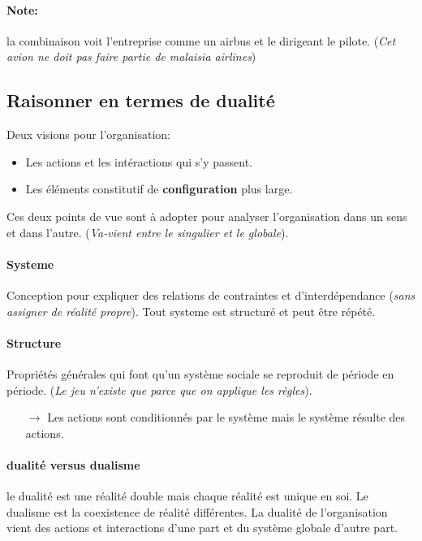 \documentclass[11pt]{article} %
\begin{document}
\paragraph{Note:} la combinaison voit l'entreprise comme un airbus et le 
dirigeant le pilote. (\textit{Cet avion ne doit pas faire partie de 
malaisia airlines})

\subsection{Raisonner en termes de dualité}
Deux visions pour l'organisation:
\begin{itemize}
	\item Les actions et les intéractions qui s'y passent.
    \item Les éléments constitutif de \textbf{configuration} plus large.
\end{itemize}

Ces deux points de vue sont à adopter pour analyser l'organisation dans
un  sens et  dans l'autre.  (\textit{Va-vient entre  le singulier  et le
globale}).

\paragraph{Systeme}   
Conception pour expliquer des relations de contraintes et
d'interdépendance (\textit{sans assigner de réalité propre}). Tout
systeme est structuré et peut être répété.

\paragraph{Structure} 
Propriétés générales qui font qu'un système sociale se reproduit de
période en période. (\textit{Le jeu n'existe que parce que on applique
les règles}). 

\begin{itemize}
    \item[$\to$] Les actions sont conditionnés par le système mais le
système résulte des actions.
\end{itemize}

\paragraph{dualité  versus  dualisme}  le dualité  est  une  réalité
double  mais chaque  réalité est  unique en  soi. Le  dualisme est  la
coexistence  de réalité  différentes. La  dualité de  l'organisation
vient  des actions  et interactions  d'une part  et du  système globale
d'autre part.
\end{document}
